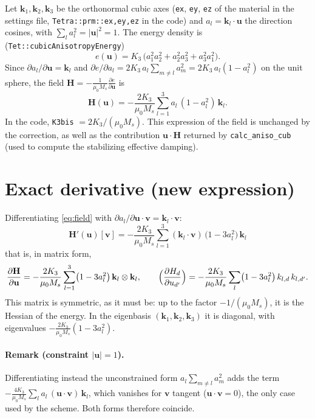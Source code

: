 \documentclass[11pt,a4paper]{article}
\newcommand{\bu}{\mathbf{u}}
\newcommand{\bv}{\mathbf{v}}
\newcommand{\bk}{\mathbf{k}}
\newcommand{\bH}{\mathbf{H}}
\begin{document}
Let $\bk_1,\bk_2,\bk_3$ be the orthonormal cubic axes (\texttt{ex}, \texttt{ey},
\texttt{ez} of the material in the settings file, \texttt{Tetra::prm::ex,ey,ez} in the
code) and $a_l=\bk_l\cdot\bu$ the direction cosines, with $\sum_l a_l^2=|\bu|^2=1$.
The energy density is (\texttt{Tet::cubicAnisotropyEnergy})
\begin{equation}
e(\bu) = K_3\,\bigl(a_1^2a_2^2+a_2^2a_3^2+a_3^2a_1^2\bigr).
\end{equation}
Since $\partial a_l/\partial\bu=\bk_l$ and $\partial e/\partial a_l = 2K_3\,a_l\sum_{m\neq l}a_m^2
= 2K_3\,a_l(1-a_l^2)$ on the unit sphere, the field
$\bH=-\frac{1}{\mu_0 M_s}\frac{\partial e}{\partial\bu}$ is
\begin{equation}
\bH(\bu) = -\frac{2K_3}{\mu_0 M_s}\sum_{l=1}^{3} a_l\,(1-a_l^2)\,\bk_l .
\label{eq:field}
\end{equation}
In the code, \texttt{K3bis} $=2K_3/(\mu_0 M_s)$. This expression of the field is
unchanged by the correction, as well as the contribution $\bu\cdot\bH$ returned by
\texttt{calc\_aniso\_cub} (used to compute the stabilizing effective damping).

\section{Exact derivative (new expression)}

Differentiating \eqref{eq:field} with $\partial a_l/\partial\bu\cdot\bv=\bk_l\cdot\bv$:
\begin{equation}
\boxed{\;
\bH'(\bu)[\bv] = -\frac{2K_3}{\mu_0 M_s}\sum_{l=1}^{3}(\bk_l\cdot\bv)\,\bigl(1-3a_l^2\bigr)\,\bk_l
\;}
\label{eq:new}
\end{equation}
that is, in matrix form,
\begin{equation}
\frac{\partial\bH}{\partial\bu}
 = -\frac{2K_3}{\mu_0 M_s}\sum_{l=1}^{3}\bigl(1-3a_l^2\bigr)\,\bk_l\otimes\bk_l ,
\qquad
\Bigl(\frac{\partial H_d}{\partial u_{d'}}\Bigr)
 = -\frac{2K_3}{\mu_0 M_s}\sum_{l}\bigl(1-3a_l^2\bigr)\,k_{l,d}\,k_{l,d'} .
\end{equation}
This matrix is symmetric, as it must be: up to the factor $-1/(\mu_0 M_s)$, it is the
Hessian of the energy. In the eigenbasis $(\bk_1,\bk_2,\bk_3)$ it is diagonal, with
eigenvalues $-\frac{2K_3}{\mu_0 M_s}(1-3a_l^2)$.

\paragraph{Remark (constraint $|\bu|=1$).} Differentiating instead the unconstrained
form $a_l\sum_{m\ne l}a_m^2$ adds the term
$-\frac{4K_3}{\mu_0 M_s}\sum_l a_l\,(\bu\cdot\bv)\,\bk_l$, which vanishes for $\bv$ tangent
($\bu\cdot\bv=0$), the only case used by the scheme. Both forms therefore coincide.
\end{document}
